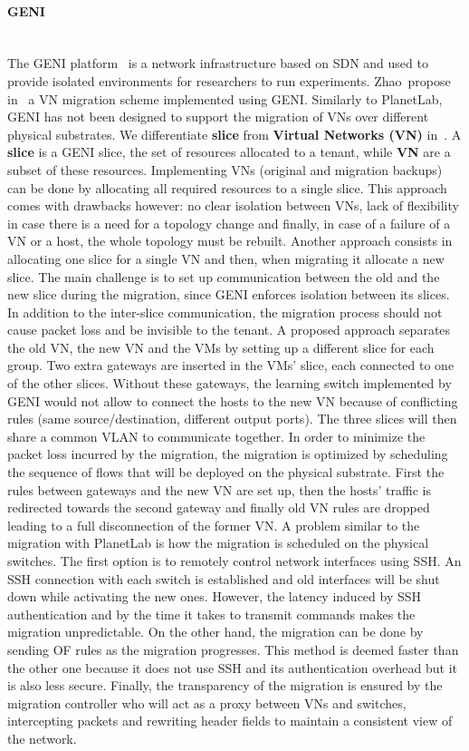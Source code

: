 \paragraph{GENI} \textbf{\\}
The GENI platform~\cite{GENI-Berman2014} is a network infrastructure based on SDN and used to provide isolated environments for researchers to run experiments.
Zhao~\etal propose in~\cite{Zhao2017} a VN migration scheme implemented using GENI. 
Similarly to PlanetLab, GENI has not been designed to support the migration of VNs over different physical substrates. 
We differentiate \textbf{slice} from \textbf{Virtual Networks (VN)} in~\cite{Zhao2017}.
A \textbf{slice} is a GENI slice, \ie the set of resources allocated to a tenant, while \textbf{VN}  are a subset of these resources.
Implementing VNs (original and migration backups) can be done by allocating all required resources to a single slice. This approach comes with drawbacks however: no clear isolation between VNs, lack of flexibility in case there is a need for a topology change and finally, in case of a failure of a VN or a host, the whole topology must be rebuilt.
Another approach consists in allocating one slice for a single VN and then, when migrating it allocate a new slice. The main challenge is to set up communication between the old and the new slice during the migration, since GENI enforces isolation between its slices.
In addition to the inter-slice communication, the migration process should not cause packet loss and be invisible to the tenant.
A proposed approach separates the old VN, the new VN and the VMs by setting up a different slice for each group. Two extra gateways are inserted in the VMs' slice, each connected to one of the other slices.
Without these gateways, the learning switch implemented by GENI would not allow to connect the hosts to the new VN because of conflicting rules (same source/destination, different output ports).
The three slices will then share a common VLAN to communicate together.
In order to minimize the packet loss incurred by the migration, the migration is optimized by scheduling the sequence of flows that will be deployed on the physical substrate.
First the rules between gateways and the new VN are set up, then the hosts' traffic is redirected towards the second gateway and finally old VN rules are dropped leading to a full disconnection of the former VN.
A problem similar to the migration with PlanetLab is how the migration is scheduled on the physical switches.
The first option is to remotely control network interfaces using SSH.
An SSH connection with each switch is established and old interfaces will be shut down while activating the new ones.
However, the latency induced by SSH authentication and by the time it takes to transmit commands makes the migration unpredictable.
On the other hand, the migration can be done by sending OF rules as the migration progresses. This method is deemed faster than the other one because it does not use SSH and its authentication overhead but it is also less secure.
Finally, the transparency of the migration is ensured by the migration controller who will act as a proxy between VNs and switches, intercepting packets and rewriting header fields to maintain a consistent view of the network.

